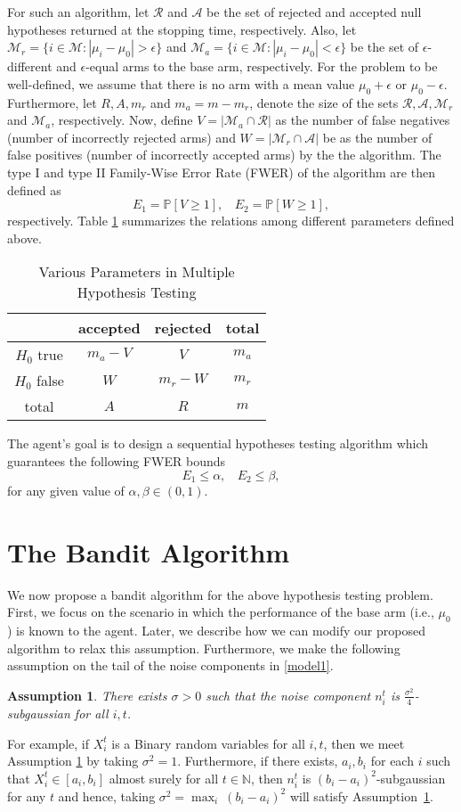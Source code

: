\documentclass[12pt]{article}
\def\P{\mathbb{P}}
\def\N{\mathbb{N}}
\def\N{\mathbb{N}}
\def\MM{\mathcal{M}}
\def\RR{\mathcal{R}}
\def\AA{\mathcal{A}}
\newtheorem{assumption}{Assumption}
\begin{document}
For such an algorithm, let  $\RR$ and $\AA$ be the set of rejected and accepted null hypotheses returned at the stopping time, respectively.  Also, let $\MM_r = \{i\in\MM:|\mu_i-\mu_0|>\epsilon\}$ and $\MM_a = \{i\in\MM:|\mu_i-\mu_0|<\epsilon\}$ be the set of $\epsilon$-different and  $\epsilon$-equal arms to the base arm, respectively. For the problem to be well-defined, we assume that there is no arm with a mean value $\mu_0+\epsilon$ or $\mu_0-\epsilon$.  Furthermore, let $R,A,m_r$ and $m_a = m-m_r$, denote the size of the sets $\RR,\AA,\MM_r$ and $\MM_a$, respectively. Now, define  $V= |\MM_a\cap\RR|$ as  the number of false negatives (number of incorrectly rejected arms) and $W = |\MM_r\cap\AA|$ be as the number of false positives (number of incorrectly accepted arms) by the the algorithm. The type I and type II Family-Wise Error Rate (FWER) of the algorithm are then defined as 
$$E_1 = \P[V\geq 1],~~~~ E_2 = \P[W\geq 1],$$
respectively. Table \ref{table1} summarizes the relations among different parameters defined above. 
\begin{table}[t]
\begin{center}
\begin{tabular}{c|c|c|c}
&accepted&rejected&total\\
\hline
$H_0$ true&$m_a-V$&\textbf{$V$}&$m_a$\\
$H_0$ false&$W$&$m_r-W$&$m_r$\\
\hline
total& $A$&$R$&$m$
\end{tabular}
\end{center}
\caption{Various Parameters in Multiple Hypothesis Testing}\label{table_multi}
\label{table1}
\end{table}

The agent's goal is to design a sequential hypotheses testing algorithm which guarantees the following FWER  bounds
$$
 E_1\leq \alpha,~~~~E_2\leq \beta,
$$
for any given value of $\alpha,\beta\in (0,1)$. 

\section{The Bandit Algorithm}
We now propose a bandit algorithm for the above hypothesis testing problem. First, we focus on the scenario in which the performance of the base arm (i.e., $\mu_0$) is known to the agent. Later, we describe how we can modify our proposed algorithm to relax this assumption. Furthermore, we make the following assumption on the tail of the noise components in \eqref{model1}. 
\begin{assumption}
\label{assmp1}
There exists $\sigma>0$ such that the noise component $n^t_i$ is  $\frac{\sigma^2}{4}$-subgaussian for all $i,t$.
\end{assumption}
For example, if $X^t_i$ is a Binary random variables for all $i,t$, then we meet 
Assumption \ref{assmp1} by taking $\sigma^2 = 1$. Furthermore, if there 
exists, $a_i,b_i$ for each $i$ such that $X^t_i\in [a_i,b_i]$ almost surely for all  $t\in\N$, then $n^t_i$ is $(b_i-a_i)^2$-subgaussian for any $t$  and 
hence, taking $\sigma^2 = \max_{i}~(b_i-a_i)^2$ will satisfy Assumption~\ref{assmp1}. 
\end{document}
